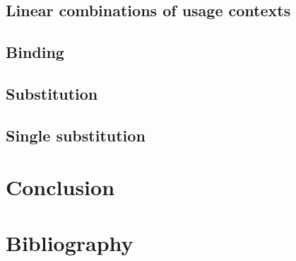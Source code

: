 \documentclass[submission,copyright,creativecommons]{eptcs}
\begin{document}
%

\subsection{Linear combinations of usage contexts}

%

\subsection{Binding}

\subsection{Substitution}

\subsection{Single substitution}

\section{Conclusion}

\section{Bibliography}



\end{document}
